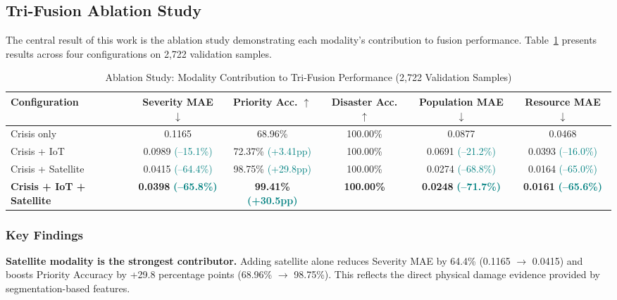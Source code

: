 \documentclass[journal]{IEEEtran}
\begin{document}
\subsection{Tri-Fusion Ablation Study}

The central result of this work is the ablation study demonstrating each modality's contribution to fusion performance. Table~\ref{tab:ablation} presents results across four configurations on 2,722 validation samples.

\begin{table}[!t]
\centering
\caption{Ablation Study: Modality Contribution to Tri-Fusion Performance (2,722 Validation Samples)}
\label{tab:ablation}
\begin{tabular}{lccccc}
\toprule
\textbf{Configuration} & \textbf{Severity MAE} $\downarrow$ & \textbf{Priority Acc.} $\uparrow$ & \textbf{Disaster Acc.} $\uparrow$ & \textbf{Population MAE} $\downarrow$ & \textbf{Resource MAE} $\downarrow$ \\
\midrule
Crisis only & 0.1165 & 68.96\% & 100.00\% & 0.0877 & 0.0468 \\
Crisis + IoT & 0.0989 \textcolor{teal}{\scriptsize(--15.1\%)} & 72.37\% \textcolor{teal}{\scriptsize(+3.41pp)} & 100.00\% & 0.0691 \textcolor{teal}{\scriptsize(--21.2\%)} & 0.0393 \textcolor{teal}{\scriptsize(--16.0\%)} \\
Crisis + Satellite & 0.0415 \textcolor{teal}{\scriptsize(--64.4\%)} & 98.75\% \textcolor{teal}{\scriptsize(+29.8pp)} & 100.00\% & 0.0274 \textcolor{teal}{\scriptsize(--68.8\%)} & 0.0164 \textcolor{teal}{\scriptsize(--65.0\%)} \\
\textbf{Crisis + IoT + Satellite} & \textbf{0.0398} \textcolor{teal}{\scriptsize\textbf{(--65.8\%)}} & \textbf{99.41\%} \textcolor{teal}{\scriptsize\textbf{(+30.5pp)}} & \textbf{100.00\%} & \textbf{0.0248} \textcolor{teal}{\scriptsize\textbf{(--71.7\%)}} & \textbf{0.0161} \textcolor{teal}{\scriptsize\textbf{(--65.6\%)}} \\
\bottomrule
\end{tabular}
\end{table}

\subsubsection{Key Findings}

\textbf{Satellite modality is the strongest contributor.} Adding satellite alone reduces Severity MAE by 64.4\% (0.1165 $\to$ 0.0415) and boosts Priority Accuracy by +29.8 percentage points (68.96\% $\to$ 98.75\%). This reflects the direct physical damage evidence provided by segmentation-based features.
\end{document}
